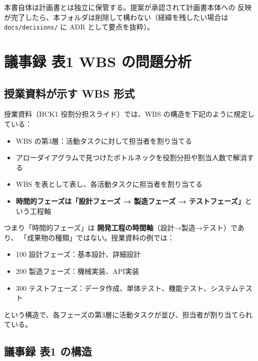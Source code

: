 \documentclass[lualatex,book,paper=a4paper,jafontsize=11pt,jafontscale=1.05]{jlreq}
\begin{document}
本書自体は計画書とは独立に保管する。提案が承認されて計画書本体への
反映が完了したら、本フォルダは削除して構わない（経緯を残したい場合は
\texttt{docs/decisions/} に ADR として要点を抜粋）。

\chapter{議事録 表1 WBS の問題分析}

\section{授業資料が示す WBS 形式}

授業資料（HCK1 役割分担スライド）では、WBS の構造を下記のように規定している：

\begin{tcolorbox}[colback=lightgray, colframe=accentblue, title={\bfseries 授業資料「7. 役割分担」要約}, breakable]
\begin{itemize}
  \item WBS の第3層：活動タスクに対して担当者を割り当てる
  \item アローダイアグラムで見つけたボトルネックを役割分担や割当人数で解消する
  \item WBS を表として表し、各活動タスクに担当者を割り当てる
  \item \textbf{時間的フェーズは「設計フェーズ → 製造フェーズ → テストフェーズ」}という工程軸
\end{itemize}
\end{tcolorbox}

つまり「時間的フェーズ」は \textbf{開発工程の時間軸}（設計→製造→テスト）であり、
「成果物の種類」ではない。授業資料の例では：

\begin{itemize}
  \item 100 設計フェーズ：基本設計、詳細設計
  \item 200 製造フェーズ：機械実装、API実装
  \item 300 テストフェーズ：データ作成、単体テスト、機能テスト、システムテスト
\end{itemize}

という構造で、各フェーズの第3層に活動タスクが並び、担当者が割り当てられている。

\section{議事録 表1 の構造}
\end{document}
